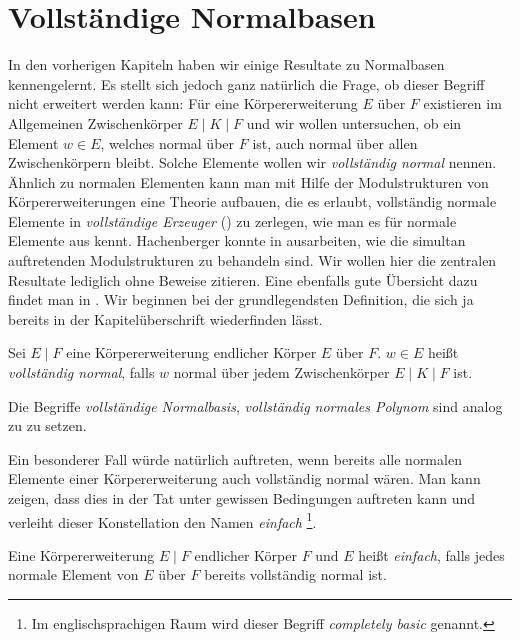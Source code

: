 \chapter{Vollständige Normalbasen}
\label{chap:vollst_normalbasen}

In den vorherigen Kapiteln haben wir einige Resultate zu Normalbasen 
kennengelernt. Es stellt sich jedoch ganz natürlich die Frage, ob dieser Begriff
nicht erweitert werden kann: Für eine Körpererweiterung $E$ über $F$ existieren
im Allgemeinen Zwischenkörper $E \mid K \mid F$ und wir wollen untersuchen,
ob ein Element $w \in E$, welches normal über $F$ ist, auch normal über allen
Zwischenkörpern bleibt. Solche Elemente wollen wir \emph{vollständig normal}
nennen. Ähnlich zu normalen Elementen kann man mit Hilfe der Modulstrukturen
von Körpererweiterungen eine Theorie aufbauen, die es erlaubt, vollständig
normale Elemente in \emph{vollständige Erzeuger} () zu
zerlegen, wie man es für normale Elemente aus 
kennt. Hachenberger konnte in \autocite{hachenberger1997finite} ausarbeiten, wie
die simultan auftretenden Modulstrukturen zu behandeln sind. Wir wollen hier
die zentralen Resultate lediglich ohne Beweise zitieren. Eine ebenfalls gute
Übersicht dazu findet man in \autocite{hachenberger2013handbook}.
Wir beginnen bei der grundlegendsten Definition, die sich ja bereits in der
Kapitelüberschrift wiederfinden lässt.

\begin{definition}
  \label{def:vollst_normal}
  Sei $E \mid F$ eine Körpererweiterung endlicher Körper $E$ über $F$.
  $w\in E$ heißt \emph{vollständig normal}, falls $w$ normal über jedem
  Zwischenkörper $E \mid K\mid F$ ist.

  Die Begriffe \emph{vollständige Normalbasis}, \emph{vollständig normales
  Polynom} sind analog zu  zu setzen.
\end{definition}

Ein besonderer Fall würde natürlich auftreten, wenn bereits alle normalen
Elemente einer Körpererweiterung auch vollständig normal wären. Man kann zeigen,
dass dies in der Tat unter gewissen Bedingungen auftreten kann und verleiht
dieser Konstellation den Namen \emph{einfach}%
\footnote{Im englischsprachigen Raum wird
dieser Begriff \emph{completely basic} genannt.}.

\begin{definition}[einfach]
  \label{def:einfach}
  Eine Körpererweiterung $E \mid F$ endlicher Körper $F$ und $E$ heißt 
  \emph{einfach}, falls jedes normale Element von $E$ über $F$ bereits
  vollständig normal ist.
\end{definition}


